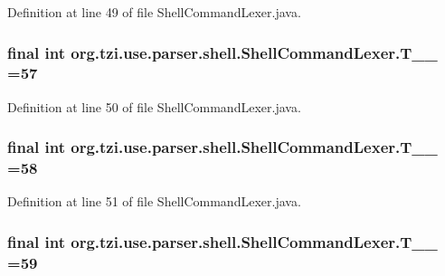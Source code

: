 Definition at line 49 of file Shell\-Command\-Lexer.\-java.

\hypertarget{classorg_1_1tzi_1_1use_1_1parser_1_1shell_1_1_shell_command_lexer_ab6e5033825299bce99a1f603473fab97}{
\subsubsection[{T\-\_\-\-\_\-57}]{\setlength{\rightskip}{0pt plus 5cm}final int org.\-tzi.\-use.\-parser.\-shell.\-Shell\-Command\-Lexer.\-T\-\_\-\-\_ =57\hspace{0.3cm}{\ttfamily [static]}}}\label{classorg_1_1tzi_1_1use_1_1parser_1_1shell_1_1_shell_command_lexer_ab6e5033825299bce99a1f603473fab97}


Definition at line 50 of file Shell\-Command\-Lexer.\-java.

\hypertarget{classorg_1_1tzi_1_1use_1_1parser_1_1shell_1_1_shell_command_lexer_addeb416ee24c7533e1cfa21bccd16b96}{
\subsubsection[{T\-\_\-\-\_\-58}]{\setlength{\rightskip}{0pt plus 5cm}final int org.\-tzi.\-use.\-parser.\-shell.\-Shell\-Command\-Lexer.\-T\-\_\-\-\_ =58\hspace{0.3cm}{\ttfamily [static]}}}\label{classorg_1_1tzi_1_1use_1_1parser_1_1shell_1_1_shell_command_lexer_addeb416ee24c7533e1cfa21bccd16b96}


Definition at line 51 of file Shell\-Command\-Lexer.\-java.

\hypertarget{classorg_1_1tzi_1_1use_1_1parser_1_1shell_1_1_shell_command_lexer_a343875c6c0c17aa7647b88415ea18651}{
\subsubsection[{T\-\_\-\-\_\-59}]{\setlength{\rightskip}{0pt plus 5cm}final int org.\-tzi.\-use.\-parser.\-shell.\-Shell\-Command\-Lexer.\-T\-\_\-\-\_ =59\hspace{0.3cm}{\ttfamily [static]}}}\label{classorg_1_1tzi_1_1use_1_1parser_1_1shell_1_1_shell_command_lexer_a343875c6c0c17aa7647b88415ea18651}


